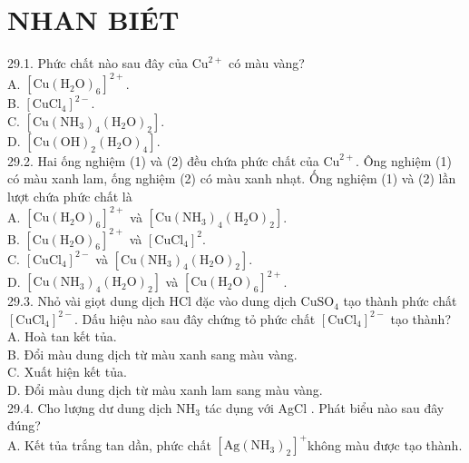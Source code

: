 \documentclass[10pt]{article}
\begin{document}
\section*{NHAN BIÉT}
29.1. Phức chất nào sau đây của $\mathrm{Cu}^{2+}$ có màu vàng?\\
A. $\left[\mathrm{Cu}\left(\mathrm{H}_{2} \mathrm{O}\right)_{6}\right]^{2+}$.\\
B. $\left[\mathrm{CuCl}_{4}\right]^{2-}$.\\
C. $\left[\mathrm{Cu}\left(\mathrm{NH}_{3}\right)_{4}\left(\mathrm{H}_{2} \mathrm{O}\right)_{2}\right]$.\\
D. $\left[\mathrm{Cu}(\mathrm{OH})_{2}\left(\mathrm{H}_{2} \mathrm{O}\right)_{4}\right]$.\\
29.2. Hai ống nghiệm (1) và (2) đều chứa phức chất của $\mathrm{Cu}^{2+}$. Ông nghiệm (1) có màu xanh lam, ống nghiệm (2) có màu xanh nhạt. Ống nghiệm (1) và (2) lần lượt chứa phức chất là\\
A. $\left[\mathrm{Cu}\left(\mathrm{H}_{2} \mathrm{O}\right)_{6}\right]^{2+}$ và $\left[\mathrm{Cu}\left(\mathrm{NH}_{3}\right)_{4}\left(\mathrm{H}_{2} \mathrm{O}\right)_{2}\right]$.\\
B. $\left[\mathrm{Cu}\left(\mathrm{H}_{2} \mathrm{O}\right)_{6}\right]^{2+}$ và $\left[\mathrm{CuCl}_{4}\right]^{2}$.\\
C. $\left[\mathrm{CuCl}_{4}\right]^{2-}$ và $\left[\mathrm{Cu}\left(\mathrm{NH}_{3}\right)_{4}\left(\mathrm{H}_{2} \mathrm{O}\right)_{2}\right]$.\\
D. $\left[\mathrm{Cu}\left(\mathrm{NH}_{3}\right)_{4}\left(\mathrm{H}_{2} \mathrm{O}\right)_{2}\right]$ và $\left[\mathrm{Cu}\left(\mathrm{H}_{2} \mathrm{O}\right)_{6}\right]^{2+}$.\\
29.3. Nhỏ vài giọt dung dịch HCl đặc vào dung dịch $\mathrm{CuSO}_{4}$ tạo thành phức chất $\left[\mathrm{CuCl}_{4}\right]^{2-}$. Dấu hiệu nào sau đây chứng tỏ phức chất $\left[\mathrm{CuCl}_{4}\right]^{2-}$ tạo thành?\\
A. Hoà tan kết tủa.\\
B. Đổi màu dung dịch từ màu xanh sang màu vàng.\\
C. Xuất hiện kết tủa.\\
D. Đổi màu dung dịch từ màu xanh lam sang màu vàng.\\
29.4. Cho lượng dư dung dịch $\mathrm{NH}_{3}$ tác dụng với AgCl . Phát biểu nào sau đây đúng?\\
A. Kết tủa trắng tan dần, phức chất $\left[\mathrm{Ag}\left(\mathrm{NH}_{3}\right)_{2}\right]^{+}$không màu được tạo thành.\\
\end{document}
